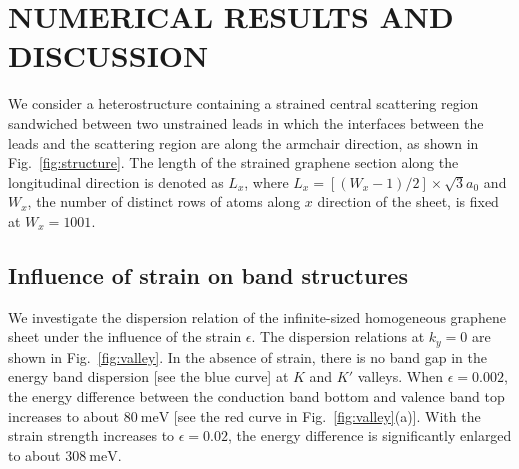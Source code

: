 \documentclass[reprint,amsmath,amssymb,aps,superscriptaddress]{revtex4-2}
\begin{document}
\section{NUMERICAL RESULTS AND DISCUSSION}\label{sec:Results}
We consider a heterostructure containing a strained central scattering region sandwiched between two unstrained leads in which the interfaces between the leads and the scattering region are along the armchair direction, as shown in Fig.~\ref{fig:structure}. The length of the strained graphene section along the longitudinal direction is denoted as $L_{x}$, where
$L_{x} = [(W_{x}-1)/2] \times\sqrt{3}a_{0}$ and $W_{x}$, the number of distinct rows of atoms along $x$ direction of the sheet, is fixed at $W_{x}=1001$.

\subsection{Influence of strain on band structures}

We investigate the dispersion relation of the infinite-sized homogeneous graphene sheet under the influence of the strain $\epsilon$. The dispersion relations at $k_y=0$ are shown in Fig.~\ref{fig:valley}. In the absence of strain, there is no band gap in the energy band dispersion [see the blue curve]
at $K$  and $K'$ valleys. When $\epsilon=0.002$, the energy difference between the conduction band bottom and valence band top increases to about $80\ \mathrm{meV}$ [see the red curve in Fig.~\ref{fig:valley}(a)].
With the strain strength increases to $\epsilon=0.02$, the energy difference is significantly enlarged to about $308\ \mathrm{meV}$.
\end{document}
